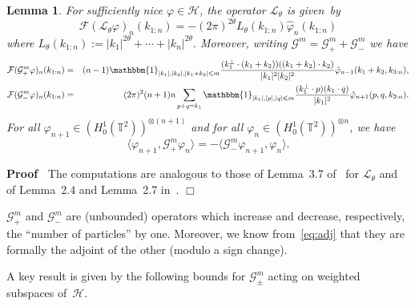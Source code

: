 \documentclass{article}
\newcommand{\assign}{:=}
\newenvironment{proof}{\noindent\textbf{Proof\ }}{\hspace*{\fill}$\Box$\medskip}
\newtheorem{lemma}{Lemma}
\begin{document}
\begin{lemma}
  For sufficiently nice $\varphi \in \mathcal{H}$, the operator
  $\mathcal{L}_{\theta}$ is given~by
  \[ \mathcal{F} (\mathcal{L}_{\theta} \varphi)_n (k_{1 : n}) = - (2 \pi)^{2
     \theta} L_{\theta} (k_{1 : n}) \hat{\varphi}_n (k_{1 : n}) \]
  where $L_{\theta} (k_{1 : n}) \assign | k_1 |^{2 \theta} + \cdots + | k_n
  |^{2 \theta} .$ Moreover, writing $\mathcal{G}^m =\mathcal{G}_+^m
  +\mathcal{G}_-^m$ we have
  \begin{eqnarray}
    \mathcal{F} (\mathcal{G}_+^m \varphi)_n (k_{1 : n}) & = & (n - 1)
    \mathbbm{1}_{| k_1 |, | k_2 |, | k_1 + k_2 | \leqslant m}
    \frac{(k_1^{\perp} \cdot (k_1 + k_2)) ((k_1 + k_2) \cdot k_2)}{| k_1 |^2 |
    k_2 |^2} \hat{\varphi}_{n - 1} (k_1 + k_2, k_{3 : n}), 
    \label{eq:gp-fourier}\\
    \mathcal{F} (\mathcal{G}_-^m \varphi)_n (k_{1 : n}) & = & (2 \pi)^2 (n +
    1) n \sum_{p + q = k_1} \mathbbm{1}_{| k_1 |, | p |, | q | \leqslant m}
    \frac{(k_1^{\perp} \cdot p) (k_1 \cdot q)}{| k_1 |^2} \hat{\varphi}_{n +
    1} (p, q, k_{2 : n}) .  \label{eq:gm-fourier}
  \end{eqnarray}
  For all $\varphi_{n + 1} \in (H^1_0 (\mathbb{T}^2))^{\otimes (n + 1)}$ and
  for all $\varphi_n \in (H^1_0 (\mathbb{T}^2))^{\otimes n}$, we have
  \begin{equation}
    \langle \varphi_{n + 1}, \mathcal{G}_+^m \varphi_n \rangle = - \langle
    \mathcal{G}_-^m \varphi_{n + 1}, \varphi_n \rangle . \label{eq:adj}
  \end{equation}
\end{lemma}

\begin{proof}
  The computations are analogous to those of Lemma~3.7
  of~{\cite{gubinelli2018energy}} for $\mathcal{L}_{\theta}$ and of Lemma~2.4
  and Lemma~2.7 in~{\cite{gubinelli2018infinitesimal}}.
\end{proof}

\begin{remark}
  $\mathcal{G}_+^m$ and $\mathcal{G}_-^m$ are (unbounded) operators which
  increase and decrease, respectively, the ``number of particles'' by one.
  Moreover, we know from~{\eqref{eq:adj}} that they are formally the adjoint
  of the other (modulo a sign change).
\end{remark}

A key result is given by the following bounds for $\mathcal{G}_{\pm}^m$ acting
on weighted subspaces of~$\mathcal{H}$.
\end{document}
